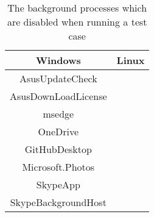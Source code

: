 \begin{table}[ht]
    \centering
    \begin{tabular}{|| c | c ||}
    \hline
    \textbf{Windows}    & \textbf{Linux}    \\[0.5ex] \hline\hline
    AsusUpdateCheck     &   \\
    AsusDownLoadLicense &   \\
    msedge              &   \\
    OneDrive            &   \\
    GitHubDesktop       &   \\
    Microsoft.Photos    &   \\
    SkypeApp            &   \\
    SkypeBackgroundHost &   \\ \hline
    \end{tabular}
    \caption{The background processes which are disabled when running a test case}
    \label{tab:disabled_proc}
\end{table}